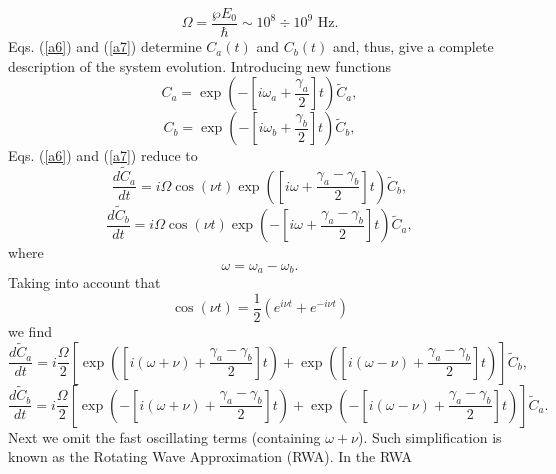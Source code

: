 \begin{equation*}
  \Omega =\frac{\wp E_{0}}{\hbar }\sim 10^{8}\div 10^{9}\text{ Hz.}
\end{equation*}%
Eqs. (\ref{a6}) and (\ref{a7}) determine $C_{a}(t)$ and $C_{b}(t)$ and,
thus, give a complete description of the system evolution. Introducing new
functions%
\begin{equation}
  C_{a}=\exp \left( -\left[ i\omega _{a}+\frac{\gamma _{a}}{2}\right] t\right)
  \tilde{C}_{a},
\end{equation}%
\begin{equation}
  C_{b}=\exp \left( -\left[ i\omega _{b}+\frac{\gamma _{b}}{2}\right] t\right)
  \tilde{C}_{b},
\end{equation}%
Eqs. (\ref{a6}) and (\ref{a7}) reduce to
\begin{equation}
  \frac{d\tilde{C}_{a}}{dt}=i\Omega \cos (\nu t)\exp \left( \left[ i\omega +%
      \frac{\gamma _{a}-\gamma _{b}}{2}\right] t\right) \tilde{C}_{b},  \label{a8}
\end{equation}%
\begin{equation}
  \frac{d\tilde{C}_{b}}{dt}=i\Omega \cos (\nu t)\exp \left( -\left[ i\omega +%
      \frac{\gamma _{a}-\gamma _{b}}{2}\right] t\right) \tilde{C}_{a},  \label{a9}
\end{equation}%
where%
\begin{equation*}
  \omega =\omega _{a}-\omega _{b}.
\end{equation*}%
Taking into account that
\begin{equation*}
  \cos (\nu t)=\frac{1}{2}\left( e^{i\nu t}+e^{-i\nu t}\right)
\end{equation*}%
we find%
\begin{equation}
  \frac{d\tilde{C}_{a}}{dt}=i\frac{\Omega }{2}\left[ \exp \left( \left[
        i(\omega +\nu )+\frac{\gamma _{a}-\gamma _{b}}{2}\right] t\right) +\exp
    \left( \left[ i(\omega -\nu )+\frac{\gamma _{a}-\gamma _{b}}{2}\right]
      t\right) \right] \tilde{C}_{b},  \label{a10}
\end{equation}%
\begin{equation}
  \frac{d\tilde{C}_{b}}{dt}=i\frac{\Omega }{2}\left[ \exp \left( -\left[
        i(\omega +\nu )+\frac{\gamma _{a}-\gamma _{b}}{2}\right] t\right) +\exp
    \left( -\left[ i(\omega -\nu )+\frac{\gamma _{a}-\gamma _{b}}{2}\right]
      t\right) \right] \tilde{C}_{a}.  \label{a11}
\end{equation}%
Next we omit the fast oscillating terms (containing $\omega +\nu $). Such
simplification is known as the Rotating Wave Approximation (RWA). In the RWA
